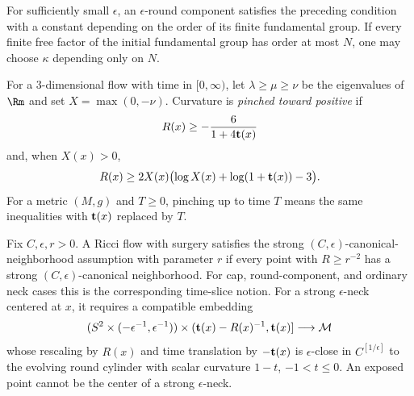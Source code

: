 \begin{remark}
\label{rem:epsilon-round-kappa-dependence}
For sufficiently small $\epsilon$, an $\epsilon$-round component satisfies the
preceding condition with a constant depending on the order of its finite
fundamental group. If every finite free factor of the initial fundamental group
has order at most $N$, one may choose $\kappa$ depending only on $N$.
\end{remark}

\begin{definition}
\label{def:curvature-pinched-toward-positive-surgery}
For a $3$-dimensional flow with time in $[0,\infty)$, let
$\lambda\geq\mu\geq\nu$ be the eigenvalues of $\Rm$ and set
$X=\max(0,-\nu)$. Curvature is \emph{pinched toward positive} if
\[
  R(x)\geq-\frac6{1+4{\bf t}(x)}
\]
and, when $X(x)>0$,
\[
  R(x)\geq2X(x)\bigl(\log X(x)+\log(1+{\bf t}(x))-3\bigr).
\]
For a metric $(M,g)$ and $T\geq0$, pinching up to time $T$ means the same
inequalities with ${\bf t}(x)$ replaced by $T$.
\end{definition}

\begin{definition}
\label{def:strong-canonical-neighborhood-assumption}
Fix $C,\epsilon,r>0$. A Ricci flow with surgery satisfies the strong
$(C,\epsilon)$-canonical-neighborhood assumption with parameter $r$ if every
point with $R\geq r^{-2}$ has a strong $(C,\epsilon)$-canonical neighborhood.
For cap, round-component, and ordinary neck cases this is the corresponding
time-slice notion. For a strong $\epsilon$-neck centered at $x$, it requires a
compatible embedding
\[
  (S^2\times(-\epsilon^{-1},\epsilon^{-1}))
  \times({\bf t}(x)-R(x)^{-1},{\bf t}(x)]
  \longrightarrow{\mathcal M}
\]
whose rescaling by $R(x)$ and time translation by $-{\bf t}(x)$ is
$\epsilon$-close in $C^{[1/\epsilon]}$ to the evolving round cylinder with
scalar curvature $1-t$, $-1<t\leq0$. An exposed point cannot be the center of
a strong $\epsilon$-neck.
\end{definition}
